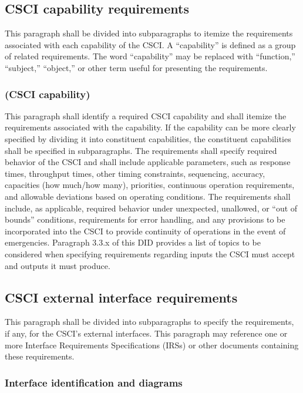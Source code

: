 \documentclass{fidata-report-template}
\begin{document}
\subsection{CSCI capability requirements}

This paragraph shall be divided into subparagraphs to itemize the
requirements associated with each capability of the CSCI. A
``capability'' is defined as a group of related requirements. The word
``capability'' may be replaced with ``function,'' ``subject,''
``object,'' or other term useful for presenting the requirements.

\subsubsection{(CSCI capability)}

This paragraph shall identify a required CSCI capability and shall
itemize the requirements associated with the capability. If the
capability can be more clearly specified by dividing it into constituent
capabilities, the constituent capabilities shall be specified in
subparagraphs. The requirements shall specify required behavior of the
CSCI and shall include applicable parameters, such as response times,
throughput times, other timing constraints, sequencing, accuracy,
capacities (how much/how many), priorities, continuous operation
requirements, and allowable deviations based on operating conditions.
The requirements shall include, as applicable, required behavior under
unexpected, unallowed, or ``out of bounds'' conditions, requirements for
error handling, and any provisions to be incorporated into the CSCI to
provide continuity of operations in the event of emergencies. Paragraph
3.3.x of this DID provides a list of topics to be considered when
specifying requirements regarding inputs the CSCI must accept and
outputs it must produce.

\subsection{CSCI external interface requirements}

This paragraph shall be divided into subparagraphs to specify the
requirements, if any, for the CSCI's external interfaces. This paragraph
may reference one or more Interface Requirements Specifications (IRSs)
or other documents containing these requirements.

\subsubsection{Interface identification and diagrams}
\end{document}
